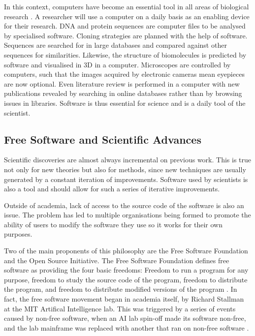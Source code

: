   In this context, computers have become an
  essential tool in all areas of biological research
  \citep{wren2016bioinformatics}.
  A researcher will use a computer on a daily
  basis as an enabling device for their research.
  DNA and protein sequences are computer files to be analysed by specialised
  software.  Cloning strategies are planned with the help of software.
  Sequences are searched for in large databases and compared against other
  sequences for similarities.
  Likewise, the structure of biomolecules is predicted by software and
  visualised in 3D in a computer.  Microscopes are controlled by
  computers, such that the images acquired by electronic cameras mean
  eyepieces are now optional.  Even
  literature review is performed in a computer with new publications
  revealed by searching in online databases rather than
  by browsing issues in libraries.  Software is
  thus essential for science and is a daily tool of the scientist.

  \subsection{Free Software and Scientific Advances}

  Scientific discoveries are almost always incremental on previous work.
  This is true not only for new theories but also
  for methods, since new techniques are usually generated by
  a constant iteration of improvements.  Software used by
  scientists is also a tool and should allow for such a
  series of iterative improvements.

  Outside of academia, lack of access to the source code of the software
  is also an issue.  The problem has led to
  multiple organisations being formed to promote the ability of users
  to modify the software they use so it works for their own
  purposes.

  Two of the main proponents of this philosophy
  are the Free Software Foundation and the
  Open Source Initiative.  The Free Software Foundation defines free
  software as providing the four basic freedoms: Freedom to run a
  program for any purpose, freedom to study the source code of the program,
  freedom to distribute the program,
  and freedom to distribute modified versions of the program
  \citep{fsf-what-is-free-software}.
  In fact,
  the free software movement began in academia itself, by
  Richard Stallman at the MIT Artifical Intelligence lab.  This was
  triggered by a series of events caused by non-free software, when
  an AI lab spin-off made its software non-free, and the lab mainframe
  was replaced with another that ran on non-free software
  \citep{stallman-essays}.

